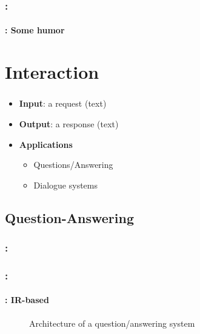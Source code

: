 \documentclass[xcolor=table]{beamer}
\begin{document}
\begin{frame}
	\frametitle{\insertshortsubtitle: \insertsection}
	\framesubtitle{\insertsubsection: Some humor}
	
	\begin{center}
	\end{center}
	
\end{frame}

\section{Interaction}

\begin{frame}
	\frametitle{\insertshortsubtitle}
	\framesubtitle{\insertsection}
	
	\begin{itemize}
		\item \textbf{Input}: a request (text)
		\item \textbf{Output}: a response (text)
		\item \textbf{Applications} 
		\begin{itemize}
			\item Questions/Answering
			\item Dialogue systems
		\end{itemize}
	\end{itemize}

\end{frame}

\subsection{Question-Answering}

\begin{frame}
	\frametitle{\insertshortsubtitle: \insertsection}
	\framesubtitle{\insertsubsection}

\end{frame}

\begin{frame}
	\frametitle{\insertshortsubtitle: \insertsection}
	\framesubtitle{\insertsubsection: IR-based}
	
	\begin{figure}
		\caption{Architecture of a question/answering system \cite{2019-jurafsky-martin}}
	\end{figure}
	
\end{frame}
\end{document}
